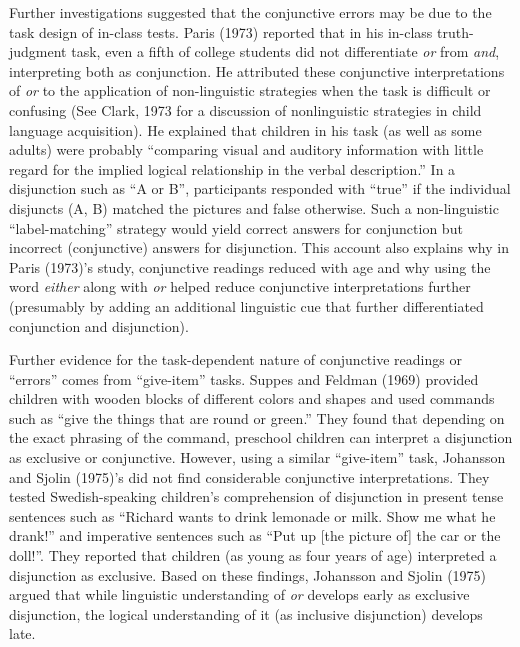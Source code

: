 \documentclass[
  english,
  ,man,floatsintext]{apa6}
\begin{document}
Further investigations suggested that the conjunctive errors may be due to the task design of in-class tests. Paris (1973) reported that in his in-class truth-judgment task, even a fifth of college students did not differentiate \emph{or} from \emph{and}, interpreting both as conjunction. He attributed these conjunctive interpretations of \emph{or} to the application of non-linguistic strategies when the task is difficult or confusing (See Clark, 1973 for a discussion of nonlinguistic strategies in child language acquisition). He explained that children in his task (as well as some adults) were probably \enquote{comparing visual and auditory information with little regard for the implied logical relationship in the verbal description.} In a disjunction such as \enquote{A or B}, participants responded with \enquote{true} if the individual disjuncts (A, B) matched the pictures and false otherwise. Such a non-linguistic \enquote{label-matching} strategy would yield correct answers for conjunction but incorrect (conjunctive) answers for disjunction. This account also explains why in Paris (1973)'s study, conjunctive readings reduced with age and why using the word \emph{either} along with \emph{or} helped reduce conjunctive interpretations further (presumably by adding an additional linguistic cue that further differentiated conjunction and disjunction).

Further evidence for the task-dependent nature of conjunctive readings or \enquote{errors} comes from \enquote{give-item} tasks. Suppes and Feldman (1969) provided children with wooden blocks of different colors and shapes and used commands such as \enquote{give the things that are round or green.} They found that depending on the exact phrasing of the command, preschool children can interpret a disjunction as exclusive or conjunctive. However, using a similar \enquote{give-item} task, Johansson and Sjolin (1975)'s did not find considerable conjunctive interpretations. They tested Swedish-speaking children's comprehension of disjunction in present tense sentences such as \enquote{Richard wants to drink lemonade or milk. Show me what he drank!} and imperative sentences such as \enquote{Put up {[}the picture of{]} the car or the doll!}. They reported that children (as young as four years of age) interpreted a disjunction as exclusive. Based on these findings, Johansson and Sjolin (1975) argued that while linguistic understanding of \emph{or} develops early as exclusive disjunction, the logical understanding of it (as inclusive disjunction) develops late.
\end{document}
